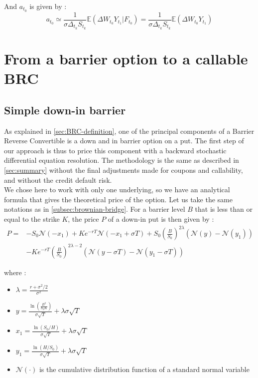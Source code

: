 \documentclass[a4paper,11pt,english]{book}
\begin{document}
And $a_{t_0}$ is given by :
$$a_{t_0} \simeq \frac{1}{\sigma \Delta_{t_k} S_{t_k}}\mathbb{E}(\Delta W_{t_0} Y_{t_{1}}|F_{t_0})=\frac{1}{\sigma \Delta_{t_k} S_{t_k}}\mathbb{E}(\Delta W_{t_0} Y_{t_{1}})$$



\chapter{From a barrier option to a callable BRC}

\section{Simple down-in barrier}
As explained in \ref{sec:BRC-definition}, one of the principal components of a Barrier Reverse Convertible is a down and in barrier option on a put. The first step of our approach is thus to price this component with a backward stochastic differential equation resolution. The methodology is the same as described in \ref{sec:summary} without the final adjustments made for coupons and callability, and without the credit default risk.\\

We chose here to work with only one underlying, so we have an analytical formula that gives the theoretical price of the option. Let us take the same notations as in \ref{subsec:brownian-bridge}. For a barrier level $B$ that is less than or equal to the strike $K$, the price $P$ of a down-in put is then given by \cite{hull2016options}: 
$$\begin{aligned}
P =& -S_{0}\mathcal{N}(-x_{1})+Ke^{-rT}\mathcal{N}(-x_{1}+\sigma T)+S_{0}(\frac{B}{S_{0}})^{2\lambda}(\mathcal{N}(y)-\mathcal{N}(y_{1})) \\
&-Ke^{-rT}(\frac{B}{S_{0}})^{2\lambda-2}(\mathcal{N}(y-\sigma T)-\mathcal{N}(y_{1}-\sigma T))
\end{aligned}$$

where :
\begin{itemize}
    \item $\lambda=\frac{r+\sigma^{2}/2}{\sigma^{2}}$
    \item $y=\frac{\ln(\frac{B^{2}}{S_{0}K})}{\sigma \sqrt{T}}+\lambda \sigma \sqrt{T}$
    \item $x_{1}=\frac{\ln(S_{0}/H)}{\sigma \sqrt{T}}+\lambda \sigma \sqrt{T}$
    \item $y_{1}=\frac{\ln(H/S_{0})}{\sigma \sqrt{T}}+\lambda \sigma \sqrt{T}$
    \item $\mathcal{N}(\cdot)$ is the cumulative distribution function of a standard normal variable
\end{itemize}
\end{document}
